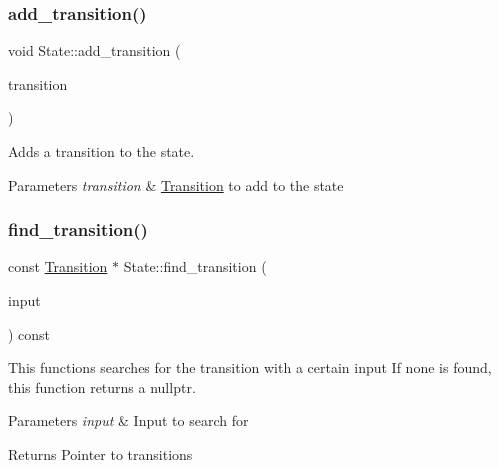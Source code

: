 \subsubsection{\texorpdfstring{add\+\_\+transition()}{add\_transition()}}
{\footnotesize\ttfamily void State\+::add\+\_\+transition (\begin{DoxyParamCaption}\item[{\hyperlink{classTransition}{Transition} \&\&}]{transition }\end{DoxyParamCaption})}



Adds a transition to the state. 


\begin{DoxyParams}{Parameters}
{\em transition} & \hyperlink{classTransition}{Transition} to add to the state \\
\hline
\end{DoxyParams}
\mbox{\label{classState_a807d7c8ed8b9c093d91900217dd302c1}} 
\subsubsection{\texorpdfstring{find\+\_\+transition()}{find\_transition()}}
{\footnotesize\ttfamily const \hyperlink{classTransition}{Transition} $\ast$ State\+::find\+\_\+transition (\begin{DoxyParamCaption}\item[{std\+::vector$<$ \hyperlink{classTapeSymbol}{Tape\+Symbol} $\ast$ $>$ \&}]{input }\end{DoxyParamCaption}) const}



This functions searches for the transition with a certain input If none is found, this function returns a nullptr. 


\begin{DoxyParams}{Parameters}
{\em input} & Input to search for \\
\hline
\end{DoxyParams}
\begin{DoxyReturn}{Returns}
Pointer to transitions 
\end{DoxyReturn}
\mbox{\label{classState_ab732c53a7478c2a24217283340e0c165}} 

